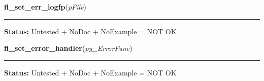     \label{xformslib:library:fl_set_err_logfp}

    \vspace{0.5ex}

\hspace{.8\funcindent}\begin{boxedminipage}{\funcwidth}

    \raggedright \textbf{fl\_set\_err\_logfp}(\textit{pFile})

    \vspace{-1.5ex}

    \rule{\textwidth}{0.5\fboxrule}
\setlength{\parskip}{2ex}
\setlength{\parskip}{1ex}
\textbf{Status:} Untested + NoDoc + NoExample = NOT OK



    \end{boxedminipage}

    \label{xformslib:library:fl_set_error_handler}

    \vspace{0.5ex}

\hspace{.8\funcindent}\begin{boxedminipage}{\funcwidth}

    \raggedright \textbf{fl\_set\_error\_handler}(\textit{py\_ErrorFunc})

    \vspace{-1.5ex}

    \rule{\textwidth}{0.5\fboxrule}
\setlength{\parskip}{2ex}
\setlength{\parskip}{1ex}
\textbf{Status:} Untested + NoDoc + NoExample = NOT OK



    \end{boxedminipage}

    \label{xformslib:library:fl_get_cmdline_args}

    \vspace{0.5ex}


